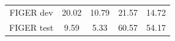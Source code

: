 \begin{table}
{\begin{tabular}{|c|cccc|}
FIGER dev        & 20.02                                       & 10.79                                                                                          & 21.57                                                                                                   & 14.72                                                                                         \\
FIGER test       & 9.59                                        & 5.33                                                                                           & 60.57                                                                                                   & 54.17                                                                                         \\ \hline
\end{tabular}}
\end{table}